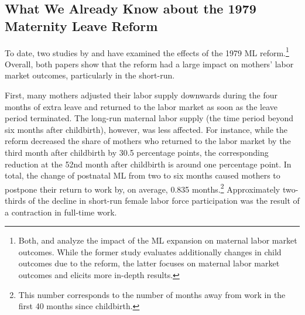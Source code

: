 


\bigskip
\subsection{What We Already Know about the 1979 Maternity Leave Reform}
To date, two studies by \cite{Dustmann2012} and \cite{schonberg2014expansions} have examined the effects of the 1979 ML reform.\footnote{Both, \cite{Dustmann2012} and \cite{schonberg2014expansions} analyze the impact of the ML expansion on maternal labor market outcomes. While the former study evaluates additionally changes in child outcomes due to the reform, the latter focuses on maternal labor market outcomes and elicits more in-depth results.} Overall, both papers show that the reform had a large impact on mothers' labor market outcomes, particularly in the short-run. 


First, many mothers adjusted their labor supply downwards during the four months of extra leave and returned to the labor market as soon as the leave period terminated. The long-run maternal labor supply (the time period beyond six months after childbirth), however, was less affected. For instance, while the reform decreased the share of mothers who returned to the labor market by the third month after childbirth by 30.5 percentage points, the corresponding reduction at the 52nd month after childbirth is around one percentage point. In total, the change of postnatal ML from two to six months caused mothers to postpone their return to work by, on average, 0.835 months.\footnote{This number corresponds to the number of months away from work in the first 40 months since childbirth.} Approximately two-thirds of the decline in short-run female labor force participation was the result of a contraction in full-time work. 


